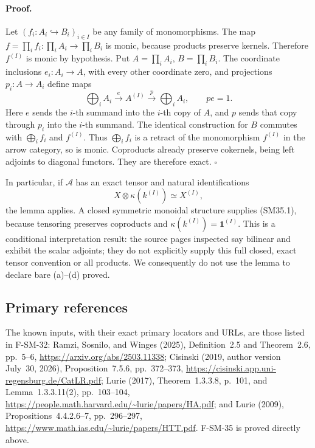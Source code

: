 \paragraph{Proof.}
Let \((f_i:A_i\hookrightarrow B_i)_{i\in I}\) be any
family of monomorphisms.  The map
\(f=\prod_i f_i:\prod_iA_i\to\prod_iB_i\) is monic,
because products preserve kernels.  Therefore
\(f^{(I)}\) is monic by hypothesis.  Put
\(A=\prod_iA_i\), \(B=\prod_iB_i\).  The coordinate
inclusions \(e_i:A_i\to A\), with every other coordinate
zero, and projections \(p_i:A\to A_i\) define maps
\[
 \bigoplus_iA_i\xrightarrow{e}A^{(I)}
                   \xrightarrow{p}\bigoplus_iA_i,
 \qquad pe=1.
\]
Here \(e\) sends the \(i\)-th summand into the \(i\)-th
copy of \(A\), and \(p\) sends that copy through \(p_i\)
into the \(i\)-th summand.  The identical construction for
\(B\) commutes with \(\bigoplus_i f_i\) and \(f^{(I)}\).
Thus \(\bigoplus_i f_i\) is a retract of the monomorphism
\(f^{(I)}\) in the arrow category, so is monic.
Coproducts already preserve cokernels, being left adjoints
to diagonal functors.  They are therefore exact. \(\square\)

In particular, if \(\mathcal A\) has an exact tensor and
natural identifications
\[
              X\otimes\kappa(k^{(I)})\simeq X^{(I)},
                                                               \tag{SM35.1}
\]
the lemma applies.  A closed symmetric monoidal structure
supplies (SM35.1), because tensoring preserves coproducts
and \(\kappa(k^{(I)})=\mathbf1^{(I)}\).
This is a conditional interpretation result: the source
pages inspected say bilinear and exhibit the scalar
adjoints; they do not explicitly supply this full closed,
exact tensor convention or all products.  We consequently
do not use the lemma to declare bare (a)--(d) proved.

\subsection{Primary references}
The known inputs, with their exact primary locators and URLs,
are those listed in F-SM-32: Ramzi, Sosnilo, and Winges
(2025), Definition~2.5 and Theorem~2.6, pp.~5--6,
\url{https://arxiv.org/abs/2503.11338};
Cisinski (2019, author version July~30, 2026),
Proposition~7.5.6, pp.~372--373,
\url{https://cisinski.app.uni-regensburg.de/CatLR.pdf};
Lurie (2017), Theorem~1.3.3.8, p.~101, and
Lemma~1.3.3.11(2), pp.~103--104,
\url{https://people.math.harvard.edu/~lurie/papers/HA.pdf};
and Lurie (2009), Propositions~4.4.2.6--7, pp.~296--297,
\url{https://www.math.ias.edu/~lurie/papers/HTT.pdf}.
F-SM-35 is proved directly above.
